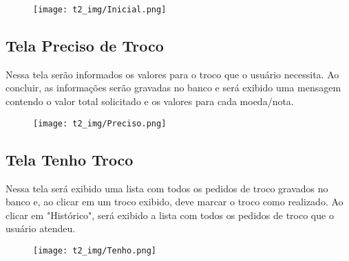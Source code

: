 \documentclass[a4paper,10pt]{article}
\begin{document}
\begin{figure}[H]
    \centering
    \texttt{[image: t2\_img/Inicial.png]}
\end{figure}

\newpage

\subsection*{Tela Preciso de Troco}

Nessa tela serão informados os valores para o troco que o usuário necessita. Ao concluir, as informações serão gravadas no banco e será exibido uma mensagem contendo o valor total solicitado e os valores para cada moeda/nota.

\begin{figure}[H]
    \centering
    \texttt{[image: t2\_img/Preciso.png]}
\end{figure}

\newpage

\subsection*{Tela Tenho Troco}

Nessa tela será exibido uma lista com todos os pedidos de troco gravados no banco e, ao clicar em um troco exibido, deve marcar o troco como realizado. Ao clicar em "Histórico", será exibido a lista com todos os pedidos de troco que o usuário atendeu.

\begin{figure}[H]
    \centering
    \texttt{[image: t2\_img/Tenho.png]}
\end{figure}
\end{document}
